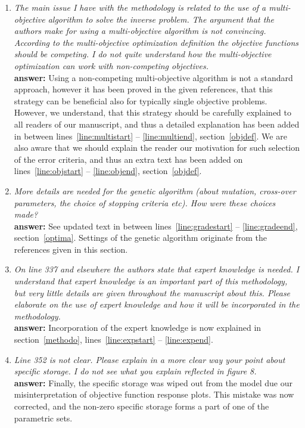 \documentclass[final,3p, 11pt, a4paper]{elsarticle}
\begin{document}
\begin{enumerate}
\item {\it  The main issue I have with the methodology is related to the use of a multi-objective algorithm to solve the inverse problem. The argument that the authors make for using a multi-objective algorithm is not convincing. According to the multi-objective optimization definition the objective functions should be competing. I do not quite understand how the multi-objective optimization can work with non-competing objectives.} \\ 
{\bf  answer:} Using a non-competing multi-objective algorithm is not a standard approach, however it has been proved in the given references, that this strategy can be beneficial also for typically single objective problems. However, we understand, that this strategy should be carefully explained to all readers of our manuscript, and thus a detailed explanation has been added in between lines~\ref{line:multistart} -- \ref{line:multiend}, section~\ref{objdef}. We are also aware that we should explain the reader our motivation for such selection of the error criteria, and thus an extra text has been added on lines~\ref{line:objstart} -- \ref{line:objend}, section~\ref{objdef}.

\item {\it   More details are needed for the genetic algorithm (about mutation, cross-over parameters, the choice of stopping criteria etc). How were these choices made?} \\
{\bf  answer:} See updated text in between lines~\ref{line:gradestart} -- \ref{line:gradeend}, section~\ref{optima}. Settings of the genetic algorithm originate from the references given in this section.

\item {\it On line 337 and elsewhere the authors state that expert knowledge is needed.  I understand that expert knowledge is an important part of this methodology, but very little details are given throughout the manuscript about this. Please elaborate on the use of expert knowledge and how it will be incorporated in the methodology.} \\
{\bf  answer:} Incorporation of the expert knowledge is now explained in section~\ref{methodo}, lines~\ref{line:expstart} -- \ref{line:expend}.

\item {\it  Line 352 is not clear. Please explain in a more clear way your point about specific storage. I do not see what you explain reflected in figure 8.} \\ 
{\bf  answer:} Finally, the specific storage was wiped out from the model due our misinterpretation of objective function response plots. This mistake was now corrected, and the non-zero specific storage forms a part of one of the parametric sets.

\end{enumerate}
\end{document}
